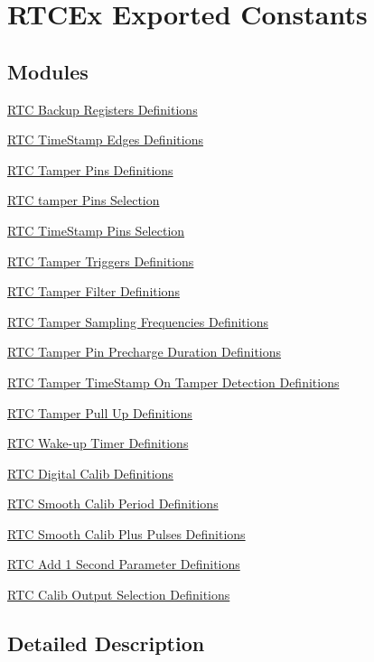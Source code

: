 \hypertarget{group___r_t_c_ex___exported___constants}{}\section{R\+T\+C\+Ex Exported Constants}
\label{group___r_t_c_ex___exported___constants}
\subsection*{Modules}
\begin{DoxyCompactItemize}
\item 
\hyperlink{group___r_t_c_ex___backup___registers___definitions}{R\+T\+C Backup Registers Definitions}
\item 
\hyperlink{group___r_t_c_ex___time___stamp___edges__definitions}{R\+T\+C Time\+Stamp Edges Definitions}
\item 
\hyperlink{group___r_t_c_ex___tamper___pins___definitions}{R\+T\+C Tamper Pins Definitions}
\item 
\hyperlink{group___r_t_c_ex___tamper___pins___selection}{R\+T\+C tamper Pins Selection}
\item 
\hyperlink{group___r_t_c_ex___time_stamp___pin___selection}{R\+T\+C Time\+Stamp Pins Selection}
\item 
\hyperlink{group___r_t_c_ex___tamper___trigger___definitions}{R\+T\+C Tamper Triggers Definitions}
\item 
\hyperlink{group___r_t_c_ex___tamper___filter___definitions}{R\+T\+C Tamper Filter Definitions}
\item 
\hyperlink{group___r_t_c_ex___tamper___sampling___frequencies___definitions}{R\+T\+C Tamper Sampling Frequencies Definitions}
\item 
\hyperlink{group___r_t_c_ex___tamper___pin___precharge___duration___definitions}{R\+T\+C Tamper Pin Precharge Duration Definitions}
\item 
\hyperlink{group___r_t_c_ex___tamper___time_stamp_on_tamper_detection___definitions}{R\+T\+C Tamper Time\+Stamp On Tamper Detection Definitions}
\item 
\hyperlink{group___r_t_c_ex___tamper___pull___u_p___definitions}{R\+T\+C Tamper Pull Up Definitions}
\item 
\hyperlink{group___r_t_c_ex___wakeup___timer___definitions}{R\+T\+C Wake-\/up Timer Definitions}
\item 
\hyperlink{group___r_t_c_ex___digital___calibration___definitions}{R\+T\+C Digital Calib Definitions}
\item 
\hyperlink{group___r_t_c_ex___smooth__calib__period___definitions}{R\+T\+C Smooth Calib Period Definitions}
\item 
\hyperlink{group___r_t_c_ex___smooth__calib___plus__pulses___definitions}{R\+T\+C Smooth Calib Plus Pulses Definitions}
\item 
\hyperlink{group___r_t_c_ex___add__1___second___parameter___definitions}{R\+T\+C Add 1 Second Parameter Definitions}
\item 
\hyperlink{group___r_t_c_ex___calib___output__selection___definitions}{R\+T\+C Calib Output Selection Definitions}
\end{DoxyCompactItemize}


\subsection{Detailed Description}
